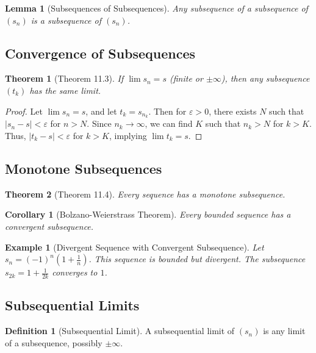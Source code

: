 \documentclass[9pt]{article}
\theoremstyle{definition}
\newtheorem{definition}{Definition}
\theoremstyle{plain}
\newtheorem{theorem}{Theorem}
\newtheorem{example}{Example}
\newtheorem{corollary}{Corollary}
\newtheorem{lemma}{Lemma}
\begin{document}
\begin{lemma}[Subsequences of Subsequences]
Any subsequence of a subsequence of $ (s_n) $ is a subsequence of $ (s_n) $.
\end{lemma}

\subsection*{Convergence of Subsequences}
\begin{theorem}[Theorem 11.3]
If $ \lim s_n = s $ (finite or $ \pm\infty $), then any subsequence $ (t_k) $ has the same limit.
\end{theorem}

\begin{proof}
Let $ \lim s_n = s $, and let $ t_k = s_{n_k} $. Then for $ \varepsilon > 0 $, there exists $ N $ such that $ |s_n - s| < \varepsilon $ for $ n > N $. Since $ n_k \to \infty $, we can find $ K $ such that $ n_k > N $ for $ k > K $. Thus, $ |t_k - s| < \varepsilon $ for $ k > K $, implying $ \lim t_k = s $.
\end{proof}

\subsection*{Monotone Subsequences}
\begin{theorem}[Theorem 11.4]
Every sequence has a monotone subsequence.
\end{theorem}

\begin{corollary}[Bolzano-Weierstrass Theorem]
Every bounded sequence has a convergent subsequence.
\end{corollary}

\begin{example}[Divergent Sequence with Convergent Subsequence]
Let $ s_n = (-1)^n \left(1 + \frac{1}{n}\right) $. This sequence is bounded but divergent. The subsequence $ s_{2k} = 1 + \frac{1}{2k} $ converges to $ 1 $.
\end{example}

\subsection*{Subsequential Limits}
\begin{definition}[Subsequential Limit]
A subsequential limit of $ (s_n) $ is any limit of a subsequence, possibly $ \pm\infty $.
\end{definition}
\end{document}
